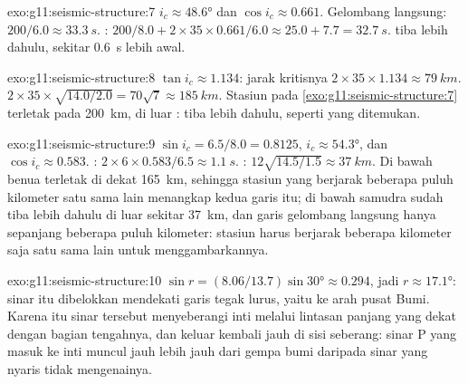 \begin{solution}{exo:g11:seismic-structure:7}
$i_c \approx \ang{48.6}$ dan $\cos i_c \approx 0.661$. Gelombang langsung: $200/6.0
\approx \qty{33.3}{s}$. : $200/8.0 + 2 \times 35 \times 0.661/6.0
\approx 25.0 + 7.7 = \qty{32.7}{s}$.  tiba lebih dahulu, sekitar
\qty{0.6}{s} lebih awal.
\end{solution}

\begin{solution}{exo:g11:seismic-structure:8}
$\tan i_c \approx 1.134$: jarak kritisnya $2 \times 35 \times 1.134
\approx \qty{79}{km}$.  $2 \times 35 \times
\sqrt{14.0/2.0} = 70\sqrt 7 \approx \qty{185}{km}$. Stasiun pada
\cref{exo:g11:seismic-structure:7} terletak pada \qty{200}{km}, di luar :  tiba lebih dahulu, seperti yang ditemukan.
\end{solution}

\begin{solution}{exo:g11:seismic-structure:9}
$\sin i_c = 6.5/8.0 = 0.8125$, $i_c \approx \ang{54.3}$, dan $\cos i_c \approx
0.583$. : $2 \times 6 \times 0.583/6.5 \approx \qty{1.1}{s}$.
: $12\sqrt{14.5/1.5} \approx \qty{37}{km}$. Di bawah benua  terletak di dekat \qty{165}{km}, sehingga stasiun yang berjarak beberapa
puluh kilometer satu sama lain menangkap kedua garis itu; di bawah samudra
 sudah tiba lebih dahulu di luar sekitar \qty{37}{km}, dan
garis gelombang langsung hanya sepanjang beberapa puluh kilometer: stasiun harus
berjarak beberapa kilometer saja satu sama lain untuk menggambarkannya.
\end{solution}

\begin{solution}{exo:g11:seismic-structure:10}
$\sin r = (8.06/13.7)\sin\ang{30} \approx 0.294$, jadi $r \approx \ang{17.1}$:
sinar itu dibelokkan mendekati garis tegak lurus, yaitu ke arah pusat Bumi.
Karena itu sinar tersebut menyeberangi inti melalui lintasan panjang yang dekat
dengan bagian tengahnya, dan keluar kembali jauh di sisi seberang: sinar P yang
masuk ke inti muncul jauh lebih jauh dari gempa bumi daripada sinar yang nyaris
tidak mengenainya.
\end{solution}

